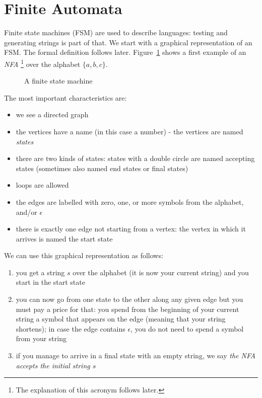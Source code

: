 \section{Finite Automata}

Finite state machines (FSM) are used to describe languages: testing
and generating strings is part of that. We start with a
graphical representation of an FSM. The formal definition follows
later. Figure~\ref{fsa1} shows a first example of an {\em
  NFA} \footnote{The explanation of this acronym follows later.} over
the alphabet $\{a,b,c\}$.

\begin{figure}[h]
\caption{A finite state machine\label{fsa1}}
\end{figure}

The most important characteristics are:

\begin{itemize}
\item we see a directed graph
\item the vertices have a name (in this case a number) - the vertices
  are named {\em states}
\item there are two kinds of states: states with a double circle are
  named accepting states (sometimes also named end states or final
  states)
\item loops are allowed
\item the edges are labelled with zero, one, or more symbols from the
  alphabet, and/or $\epsilon$
\item there is exactly one edge not starting from a vertex: the vertex
  in which it arrives is named the start state
\end{itemize}

We can use this graphical representation as follows:

\begin{enumerate}
\item you get a string $s$ over the alphabet (it is now your current
  string) and you start in the start state
\item you can now go from one state to the other along any given
  edge but you must pay a price for that: you spend from the beginning
  of your current string a symbol that appears on the edge (meaning
  that your string shortens); in case the edge contains $\epsilon$,
  you do not need to spend a symbol from your string
\item if you manage to arrive in a final state with an empty string,
  we say {\em the NFA accepts the initial string $s$}
\end{enumerate}

